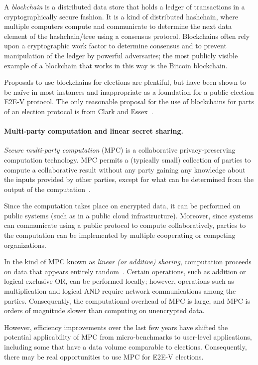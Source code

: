 A \emph{blockchain} is a distributed data store that holds a ledger of
transactions in a cryptographically secure fashion. It is a kind of
distributed hashchain, where multiple computers compute and
communicate to determine the next data element of the hashchain/tree
using a consensus protocol. Blockchains often rely upon a
cryptographic work factor to determine consensus and to prevent
manipulation of the ledger by powerful adversaries; the most publicly
visible example of a blockchain that works in this way is the Bitcoin
blockchain.~\cite{Bitcoin}

Proposals to use blockchains for elections are plentiful, but have
been shown to be na\"{i}ve in most instances and inappropriate as a
foundation for a public election E2E-V protocol. The only reasonable
proposal for the use of blockchains for parts of an election protocol
is from Clark and Essex~\cite{clark2012commitcoin}.

\paragraph{Multi-party computation and linear secret sharing.}
\emph{Secure multi-party computation} (MPC) is a collaborative
privacy-preserving computation technology. MPC permits a (typically
small) collection of parties to compute a collaborative result without
any party gaining any knowledge about the inputs provided by other
parties, except for what can be determined from the output of the
computation~\cite{chaum1988multiparty, goldwasser1987play}.

Since the computation takes place on encrypted data, it can be
performed on public systems (such as in a public cloud
infrastructure). Moreover, since systems can communicate using a
public protocol to compute collaboratively, parties to the computation
can be implemented by multiple cooperating or competing organizations.

In the kind of MPC known as \emph{linear (or additive) sharing},
computation proceeds on data that appears entirely
random~\cite{Cramer00}. Certain operations, such as addition or
logical exclusive OR, can be performed locally; however, operations
such as multiplication and logical AND require network communications
among the parties. Consequently, the computational overhead of MPC is
large, and MPC is orders of magnitude slower than computing on
unencrypted data.

However, efficiency improvements over the last few years have shifted
the potential applicability of MPC from micro-benchmarks to user-level
applications, including some that have a data volume comparable to
elections. Consequently, there may be real opportunities to use MPC
for E2E-V elections.


